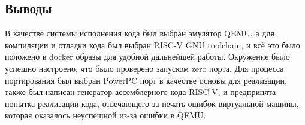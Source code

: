 \subsection{Выводы}

В качестве системы исполнения кода был выбран эмулятор QEMU, а для компиляции и отладки кода был выбран RISC-V GNU toolchain, и всё это было положено в docker образы для удобной дальнейшей работы. Окружение было успешно настроено, что было проверено запуском zero порта. Для процесса портирования был выбран PowerPC порт в качестве основы для реализации, также был написан генератор ассемблерного кода RISC-V, и предпринята попытка реализации кода, отвечающего за печать ошибок виртуальной машины, которая оказалось неуспешной из-за ошибки в QEMU.


